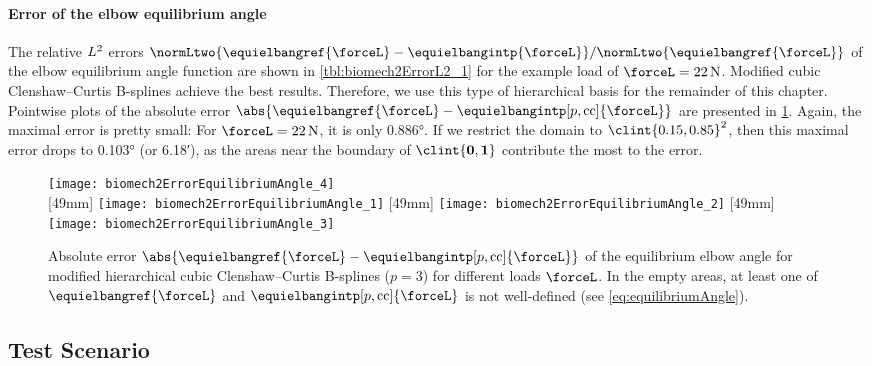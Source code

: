 \paragraph{Error of the elbow equilibrium angle}

The relative $L^2$ errors
$\normLtwo{\equielbangref{\forceL} - \equielbangintp{\forceL}}/
\normLtwo{\equielbangref{\forceL}}$
of the elbow equilibrium angle function are shown in
\cref{tbl:biomech2ErrorL2_1} for the example load of
$\forceL = \SI{22}{\newton}$.
Modified cubic Clenshaw--Curtis B-splines achieve the best results.
Therefore, we use this type of hierarchical basis
for the remainder of this chapter.
Pointwise plots of the absolute error
$\abs{\equielbangref{\forceL} - \equielbangintp[p,\cc]{\forceL}}$
are presented in \cref{fig:biomech2ErrorEquilibriumAngle}.
Again, the maximal error is pretty small:
For $\forceL = \SI{22}{\newton}$, it is only \ang{0.886}.
If we restrict the domain to $\clint{0.15, 0.85}^2$,
then this maximal error drops to \ang{0.103} (or \ang{;6.18;}),
as the areas near the boundary of $\clint{\*0, \*1}$
contribute the most to the error.

\begin{figure}
  \texttt{[image: biomech2ErrorEquilibriumAngle\_4]}%
  \\[2mm]%
  [49mm]{%
    \texttt{[image: biomech2ErrorEquilibriumAngle\_1]}%
  }%
  \hfill%
  [49mm]{%
    \texttt{[image: biomech2ErrorEquilibriumAngle\_2]}%
  }%
  \hfill%
  [49mm]{%
    \texttt{[image: biomech2ErrorEquilibriumAngle\_3]}%
  }%
  \caption[Absolute error of the equilibrium elbow angle]{%
    Absolute error
    $\abs{\equielbangref{\forceL} - \equielbangintp[p,\cc]{\forceL}}$
    of the equilibrium elbow angle for
    modified hierarchical cubic Clenshaw--Curtis B-splines ($p = 3$)
    for different loads $\forceL$.
    In the empty areas, at least one of
    $\equielbangref{\forceL}$ and $\equielbangintp[p,\cc]{\forceL}$
    is not well-defined (see \cref{eq:equilibriumAngle}).%
  }%
  \label{fig:biomech2ErrorEquilibriumAngle}%
\end{figure}



\subsection{Test Scenario}
\label{sec:733scenario}

